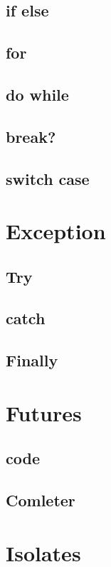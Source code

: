 \documentclass[10pt]{book}
\begin{document}
\subsection{if else}
\lipsum[28]
\subsection{for}
\lipsum[29]
\subsection{do while}
\lipsum[30]
\subsection{break?}
\lipsum[31]
\subsection{switch case}
\lipsum[32]

\section{Exception}
\lipsum[33]
\subsection{Try}
\lipsum[34]
\subsection{catch}
\lipsum[35]
\subsection{Finally}
\lipsum[36]

\section{Futures}
\lipsum[37]
\subsection{code}
\lipsum[38]
\subsection{Comleter}
\lipsum[39]

\section{Isolates}
\lipsum[40]
\end{document}
